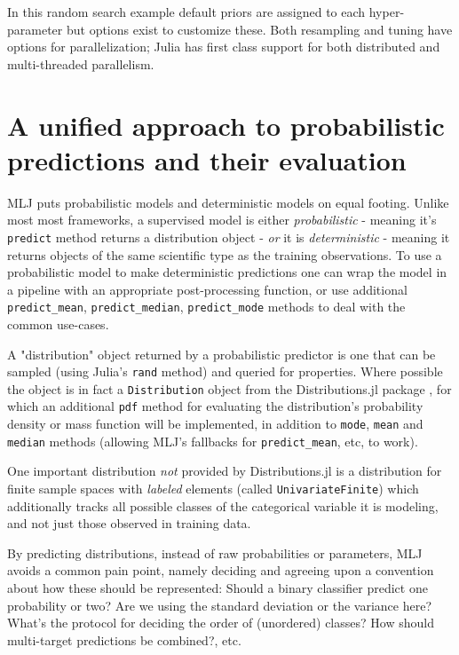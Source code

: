 \documentclass{article}
\begin{document}
In this random search example default priors are assigned to each
hyper-parameter but options exist to customize these. Both resampling
and tuning have options for parallelization; Julia has first class
support for both distributed and multi-threaded parallelism.

\section{A unified approach to probabilistic predictions and their
  evaluation}

MLJ puts probabilistic models and deterministic models on equal
footing. Unlike most most frameworks, a supervised model is either
\textit{probabilistic} - meaning it's \texttt{predict} method returns a
distribution object - \textit{or} it is \textit{deterministic} -
meaning it returns objects of the same scientific type as the training
observations. To use a probabilistic model to make deterministic
predictions one can wrap the model in a pipeline with an appropriate
post-processing function, or use additional \texttt{predict\_mean},
\texttt{predict\_median}, \texttt{predict\_mode} methods to deal with
the common use-cases.

A "distribution" object returned by a probabilistic predictor is one
that can be sampled (using Julia's \texttt{rand} method) and queried
for properties. Where possible the object is in fact a
\texttt{Distribution} object from the Distributions.jl package
\cite{LinEtal2020}, for which an additional \texttt{pdf} method for
evaluating the distribution's probability density or mass function
will be implemented, in addition to \texttt{mode}, \texttt{mean}
and \texttt{median} methods (allowing MLJ's fallbacks for
\texttt{predict\_mean}, etc, to work).

One important distribution \textit{not} provided by Distributions.jl
is a distribution for finite sample spaces with {\em labeled} elements
(called \texttt{UnivariateFinite}) which additionally tracks all
possible classes of the categorical variable it is modeling, and not
just those observed in training data.

By predicting distributions, instead of raw probabilities or
parameters, MLJ avoids a common pain point, namely deciding and
agreeing upon a convention about how these should be represented:
Should a binary classifier predict one probability or two? Are we
using the standard deviation or the variance here? What's the protocol
for deciding the order of (unordered) classes? How should multi-target
predictions be combined?, etc.
\end{document}
